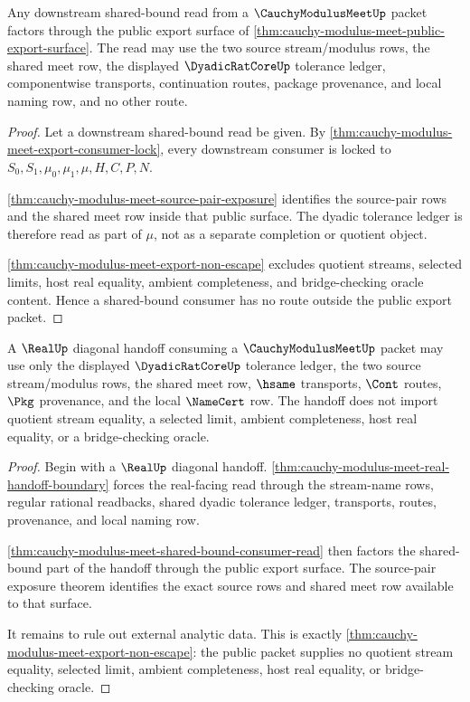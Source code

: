 \begin{theorem}
\label{thm:cauchy-modulus-meet-shared-bound-consumer-read}
Any downstream shared-bound read from a $\CauchyModulusMeetUp$ packet factors through the public export surface of \autoref{thm:cauchy-modulus-meet-public-export-surface}. The read may use the two source stream/modulus rows, the shared meet row, the displayed $\DyadicRatCoreUp$ tolerance ledger, componentwise transports, continuation routes, package provenance, and local naming row, and no other route.
\end{theorem}
\begin{proof}
Let a downstream shared-bound read be given. By \autoref{thm:cauchy-modulus-meet-export-consumer-lock}, every downstream consumer is locked to $S_0,S_1,\mu_0,\mu_1,\mu,H,C,P,N$.

\autoref{thm:cauchy-modulus-meet-source-pair-exposure} identifies the source-pair rows and the shared meet row inside that public surface. The dyadic tolerance ledger is therefore read as part of $\mu$, not as a separate completion or quotient object.

\autoref{thm:cauchy-modulus-meet-export-non-escape} excludes quotient streams, selected limits, host real equality, ambient completeness, and bridge-checking oracle content. Hence a shared-bound consumer has no route outside the public export packet.
\end{proof}

\begin{theorem}
\label{thm:cauchy-modulus-meet-diagonal-handoff-scope}
A $\RealUp$ diagonal handoff consuming a $\CauchyModulusMeetUp$ packet may use only the displayed $\DyadicRatCoreUp$ tolerance ledger, the two source stream/modulus rows, the shared meet row, $\hsame$ transports, $\Cont$ routes, $\Pkg$ provenance, and the local $\NameCert$ row. The handoff does not import quotient stream equality, a selected limit, ambient completeness, host real equality, or a bridge-checking oracle.
\end{theorem}
\begin{proof}
Begin with a $\RealUp$ diagonal handoff. \autoref{thm:cauchy-modulus-meet-real-handoff-boundary} forces the real-facing read through the stream-name rows, regular rational readbacks, shared dyadic tolerance ledger, transports, routes, provenance, and local naming row.

\autoref{thm:cauchy-modulus-meet-shared-bound-consumer-read} then factors the shared-bound part of the handoff through the public export surface. The source-pair exposure theorem identifies the exact source rows and shared meet row available to that surface.

It remains to rule out external analytic data. This is exactly \autoref{thm:cauchy-modulus-meet-export-non-escape}: the public packet supplies no quotient stream equality, selected limit, ambient completeness, host real equality, or bridge-checking oracle.
\end{proof}

